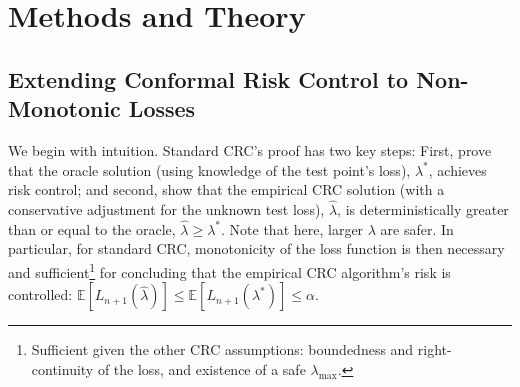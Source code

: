 \section{Methods and Theory}
\label{sec:theory}

\setlength{\fboxrule}{0.1pt} 
\setlength{\fboxsep}{0.1pt}

\subsection{Extending Conformal Risk Control to Non-Monotonic Losses}
\label{subsec:finite_sample_guarantees_crc_non_monotone}

We begin with intuition. Standard CRC's proof \citep{angelopoulos2022conformal} has two key steps: First, prove that the oracle solution (using knowledge of the test point's loss), $\lambda^*$, achieves risk control; and second, show that the empirical CRC solution (with a conservative adjustment for the unknown test loss), $\hat{\lambda}$, is deterministically greater than or equal to the oracle, $\hat{\lambda}\geq \lambda^*$. Note that here, larger $\lambda$ are safer. In particular, for standard CRC, monotonicity of the loss function is then necessary and sufficient\footnote{Sufficient given the other CRC assumptions: boundedness and right-continuity of the loss, and existence of a safe $\lambda_{\max}$.} for concluding that the empirical CRC algorithm's risk is controlled: $\mathbb{E}[L_{n+1}(\hat{\lambda})] \leq \mathbb{E}[L_{n+1}(\lambda^*)]\leq \alpha$. 


